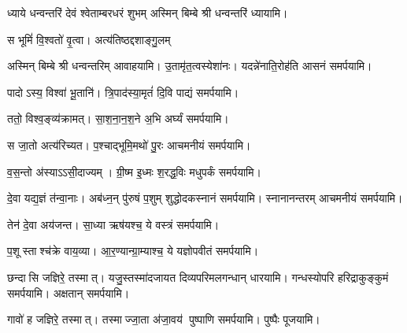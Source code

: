 {ध्याये धन्वन्तरिं देवं श्वेताम्बरधरं शुभम्}
अस्मिन् बिम्बे श्री धन्वन्तरिं ध्यायामि।
\medskip

{स भूमिं॑ वि॒श्वतो॑ वृ॒त्वा। अत्य॑तिष्ठद्दशाङ्गु॒लम्}

अस्मिन् बिम्बे श्री धन्वन्तरिम् आवाहयामि।
\medskip
{}
 {उ॒तामृ॑त॒त्वस्येशा॑नः। यदन्ने॑नाति॒रोह॑ति}
 आसनं समर्पयामि।\medskip

{पादोऽस्य॒ विश्वा॑ भू॒तानि॑। त्रि॒पाद॑स्या॒मृतं॑ दि॒वि}
 पाद्यं समर्पयामि।\medskip
 
{ततो॒ विश्व॒ङ्व्य॑क्रामत्। सा॒श॒ना॒न॒श॒ने अ॒भि}
 अर्घ्यं समर्पयामि।\medskip

{स जा॒तो अत्य॑रिच्यत। प॒श्चाद्भूमि॒मथो॑ पु॒रः}
 आचमनीयं समर्पयामि।\medskip

{व॒स॒न्तो अ॑स्याऽऽसी॒दाज्यम्। ग्री॒ष्म इ॒ध्मः श॒रद्ध॒विः}
मधुपर्कं समर्पयामि।\medskip

 {दे॒वा यद्य॒ज्ञं त॑न्वा॒नाः। अब॑ध्न॒न् पु॑रुषं प॒शुम्}
 शुद्धोदकस्नानं समर्पयामि। स्नानानन्तरम् आचमनीयं समर्पयामि।\medskip

 {तेन॑ दे॒वा अय॑जन्त। सा॒ध्या ऋष॑यश्च॒ ये}
 वस्त्रं समर्पयामि।\medskip

{प॒शूस्ताश्च॑क्रे वाय॒व्या\sn{}। आ॒र॒ण्यान्ग्रा॒म्याश्च॒ ये}
 यज्ञोपवीतं समर्पयामि।\medskip

{छन्दासि जज्ञिरे॒ तस्मात्। यजु॒स्तस्मा॑दजायत}
 दिव्यपरिमलगन्धान् धारयामि। गन्धस्योपरि हरिद्राकुङ्कुमं समर्पयामि। अक्षतान् समर्पयामि।\medskip

{गावो॑ ह जज्ञिरे॒ तस्मात्। तस्माज्जा॒ता अ॑जा॒वय॑}
  पुष्पाणि समर्पयामि।  पुष्पैः पूजयामि।

